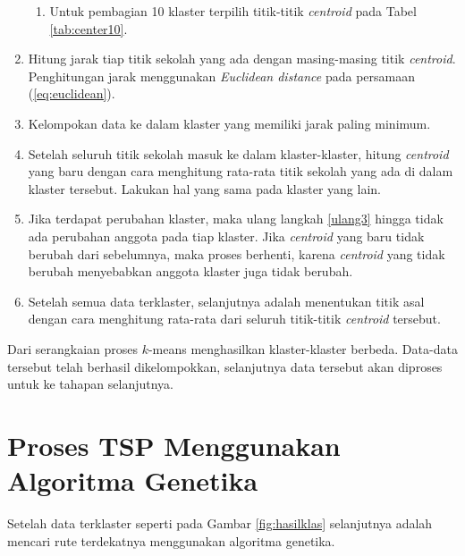 \begin{enumerate}
\begin{enumerate}


	\item Untuk pembagian 10 klaster terpilih titik-titik \textit{centroid} pada Tabel \ref{tab:center10}.
	

		
	\end{enumerate}

	\item \label{ulang3} Hitung jarak tiap titik sekolah yang ada dengan masing-masing titik \textit{centroid}. Penghitungan jarak menggunakan \textit{Euclidean distance} pada persamaan (\ref{eq:euclidean}).
	
	\item Kelompokan data ke dalam klaster yang memiliki jarak paling minimum.
	\item Setelah seluruh titik sekolah masuk ke dalam klaster-klaster, hitung \textit{centroid} yang baru dengan cara menghitung rata-rata titik sekolah yang ada di dalam klaster tersebut. Lakukan hal yang sama pada klaster yang lain.
	\item Jika terdapat perubahan klaster, maka ulang langkah \ref{ulang3} hingga tidak ada perubahan anggota pada tiap klaster. Jika \textit{centroid} yang baru tidak berubah dari sebelumnya, maka proses berhenti, karena \textit{centroid} yang tidak berubah menyebabkan anggota klaster juga tidak berubah.
	
	\item Setelah semua data terklaster, selanjutnya adalah menentukan titik asal dengan cara menghitung rata-rata dari seluruh titik-titik \textit{centroid} tersebut.
\end{enumerate}

Dari serangkaian proses $k$-means menghasilkan klaster-klaster berbeda. Data-data tersebut telah berhasil dikelompokkan, selanjutnya data tersebut akan diproses untuk ke tahapan selanjutnya.

\section{Proses TSP Menggunakan Algoritma Genetika}

Setelah data terklaster seperti pada Gambar \ref{fig:hasilklas} selanjutnya adalah mencari rute terdekatnya menggunakan algoritma genetika.

